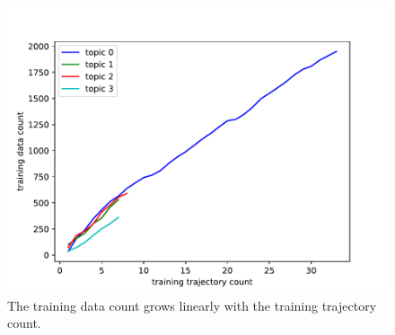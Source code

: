 \begin{figure}
\centering
    \includegraphics[width=\linewidth]{./img/gp/gp-ds.pdf}
    \caption{The training data count grows linearly with the training trajectory count.}
    \label{fig:gp-ds}
\end{figure}
